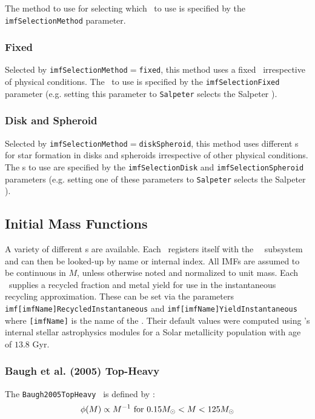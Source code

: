The method to use for selecting which \IMF\ to use is specified by the {\tt imfSelectionMethod} parameter.

\subsubsection{Fixed}

Selected by {\tt imfSelectionMethod}$=${\tt fixed}, this method uses a fixed \IMF\ irrespective of physical conditions. The \IMF\ to use is specified by the {\tt imfSelectionFixed} parameter (e.g. setting this parameter to {\tt Salpeter} selects the Salpeter \IMF).

\subsubsection{Disk and Spheroid}

Selected by {\tt imfSelectionMethod}$=${\tt diskSpheroid}, this method uses different {\IMF}s for star formation in disks and spheroids irrespective of other physical conditions. The {\IMF}s to use are specified by the {\tt imfSelectionDisk} and {\tt imfSelectionSpheroid} parameters (e.g. setting one of these parameters to {\tt Salpeter} selects the Salpeter \IMF).

\subsection{Initial Mass Functions}\label{sec:physicsIMF}

A variety of different \IMF s are available. Each \IMF\ registers itself with the \glc\ \IMF\ subsystem and can then be looked-up by name or internal index. All IMFs are assumed to be continuous in $M$, unless otherwise noted and normalized to unit mass. Each \IMF\ supplies a recycled fraction and metal yield for use in the instantaneous recycling approximation. These can be set via the parameters {\tt imf[imfName]RecycledInstantaneous} and {\tt imf[imfName]YieldInstantaneous} where {\tt [imfName]} is the name of the \IMF. Their default values were computed using \glc 's internal stellar astrophysics modules for a Solar metallicity population with age of $13.8$ Gyr.

\subsubsection{Baugh et al. (2005) Top-Heavy}

The {\tt Baugh2005TopHeavy} \IMF\ is defined by \citep{baugh_can_2005}:
\begin{equation}
 \phi(M) \propto 
 M^{-1} \hbox{ for } 0.15M_\odot < M < 125M_\odot
\end{equation}

